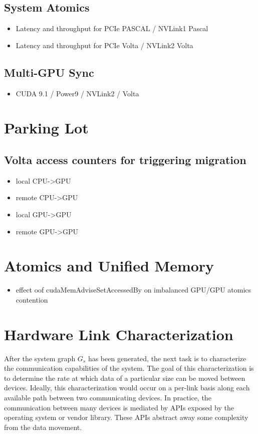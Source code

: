 \subsection{System Atomics}
\begin{itemize}
    \item Latency and throughput for PCIe PASCAL / NVLink1 Pascal 
    \item Latency and throughput for PCIe Volta / NVLink2 Volta
\end{itemize}

\subsection{Multi-GPU Sync}
\begin{itemize}
    \item CUDA 9.1 / Power9 / NVLink2 / Volta
\end{itemize}


\section{Parking Lot}
\subsection{Volta access counters for triggering migration}
\begin{itemize}
    \item local CPU->GPU
    \item remote CPU->GPU
    \item local GPU->GPU
    \item remote GPU->GPU
\end{itemize}


\section{Atomics and Unified Memory}
\begin{itemize}
    \item effect oof cudaMemAdviseSetAccessedBy on imbalanced GPU/GPU atomics contention
\end{itemize}


%
%
\section{Hardware Link Characterization}
\label{sec:link-char}

After the system graph $G_s$ has been generated, the next task is to characterize the communication capabilities of the system.
The goal of this characterization is to determine the rate at which data of a particular size can be moved between devices.
Ideally, this characterization would occur on a per-link basis along each available path between two communicating devices.
In practice, the communication between many devices is mediated by APIs exposed by the operating system or vendor library.
These APIs abstract away some complexity from the data movement.

